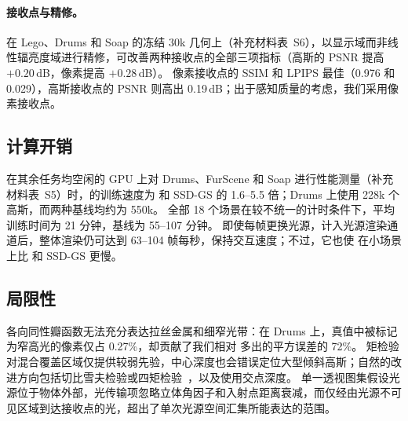 \paragraph{接收点与精修。}
在 Lego、Drums 和 Soap 的冻结 30k 几何上（补充材料表~S6），以显示域而非线性辐亮度域进行精修，可改善两种接收点的全部三项指标（高斯的 PSNR 提高 $+0.20$\,dB，像素提高 $+0.28$\,dB）。
像素接收点的 SSIM 和 LPIPS 最佳（0.976 和 0.029），高斯接收点的 PSNR 则高出 0.19\,dB；出于感知质量的考虑，我们采用像素接收点。

\subsection{计算开销}
\label{sec:exp_cost}
在其余任务均空闲的 GPU 上对 Drums、FurScene 和 Soap 进行性能测量（补充材料表~S5）时，\ours 的训练速度为 \gsthree 和 SSD-GS 的 1.6--5.5 倍；Drums 上使用 228k 个高斯，而两种基线均约为 550k。
全部 18 个场景在较不统一的计时条件下，平均训练时间为 21 分钟，基线为 55--107 分钟。
即使每帧更换光源，计入光源渲染通道后，整体渲染仍可达到 63--104 帧每秒，保持交互速度；不过，它也使 \ours 在小场景上比 \gsthree 和 SSD-GS 更慢。

\subsection{局限性}
\label{sec:limitations}
各向同性瓣函数无法充分表达拉丝金属和细窄光带：在 Drums 上，真值中被标记为窄高光的像素仅占 0.27\%，却贡献了我们相对 \gsthree 多出的平方误差的 72\%。
矩检验对混合覆盖区域仅提供较弱先验，中心深度也会错误定位大型倾斜高斯；自然的改进方向包括切比雪夫检验或四矩检验~\cite{donnelly2006variance,peters2015moment}，以及使用交点深度。
单一透视图集假设光源位于物体外部，光传输项忽略立体角因子和入射点距离衰减，而仅经由光源不可见区域到达接收点的光，超出了单次光源空间汇集所能表达的范围。
